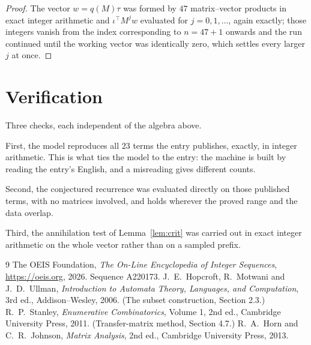 \documentclass[11pt,a4paper]{article}
\theoremstyle{plain}
\theoremstyle{definition}
\begin{document}
\begin{proof}
The vector $w=q(M)\tau$ was formed by $47$ matrix--vector products in exact integer
arithmetic and $\iota^{\!\top}M^{j}w$ evaluated for $j=0,1,\dots$, again exactly; those
integers vanish from the index corresponding to $n=47+1$ onwards and the run continued
until the working vector was identically zero, which settles every larger $j$ at once.
\end{proof}

\section{Verification}

Three checks, each independent of the algebra above.

First, the model reproduces all $23$ terms the entry publishes, exactly, in integer
arithmetic. This is what ties the model to the entry: the machine is built by reading the
entry's English, and a misreading gives different counts.

Second, the conjectured recurrence was evaluated directly on those published terms, with no
matrices involved, and holds wherever the proved range and the data overlap.

Third, the annihilation test of Lemma~\ref{lem:crit} was carried out in exact integer
arithmetic on the whole vector rather than on a sampled prefix.

\begin{thebibliography}{9}
 The OEIS Foundation, \emph{The On-Line Encyclopedia of Integer
Sequences}, \url{https://oeis.org}, 2026. Sequence A220173.
 J.~E.~Hopcroft, R.~Motwani and J.~D.~Ullman, \emph{Introduction to Automata
Theory, Languages, and Computation}, 3rd ed., Addison--Wesley, 2006. (The subset
construction, Section 2.3.)
 R.~P.~Stanley, \emph{Enumerative Combinatorics}, Volume 1, 2nd ed.,
Cambridge University Press, 2011. (Transfer-matrix method, Section 4.7.)
 R.~A.~Horn and C.~R.~Johnson, \emph{Matrix Analysis}, 2nd ed., Cambridge
University Press, 2013.
\end{thebibliography}
\end{document}
